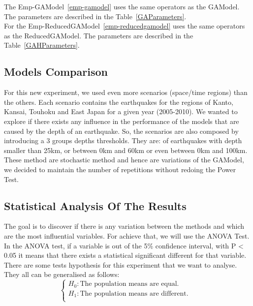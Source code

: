 The Emp-GAModel~\ref{emp-gamodel} uses the same operators as the GAModel. The parameters are described in the Table~\ref{GAParameters}.\\

For the Emp-ReducedGAModel~\ref{emp-reducedgamodel} uses the same operators as the ReducedGAModel. The parameters are described in the Table~\ref{GAHParameters}.\\


\subsection{Models Comparison}
For this new experiment, we used even more scenarios (space/time regions) than the others. Each scenario contains the earthquakes for the regions of Kanto, Kansai, Touhoku and East Japan for a given year (2005-2010). We wanted to explore if there exists any influence in the performance of the models that are caused by the depth of an earthquake. So, the scenarios are also composed by introducing a 3 groups depths thresholds. They are: of earthquakes with depth smaller than 25km, or between 0km and 60km or even between 0km and 100km.\\

These method are stochastic method and hence are variations of the GAModel, we decided to maintain the number of repetitions without redoing the Power Test.\\

\subsection{Statistical Analysis Of The Results}\label{anova}

The goal is to discover if there is any variation between the methods and which are the most influential variables. For achieve that, we will use the ANOVA Test.\\

In the ANOVA test, if a variable is out of the 5\% confidence interval, with P < 0.05 it means that there exists a statistical significant different for that variable.\\

There are some tests hypothesis for this experiment that we want to analyse. They all can be generalised as follows:\\

$$\begin{cases} H_0: \text{The population means are equal.} &\\
H_1: \text{The population means are different.}&\\
\end{cases}$$\\

